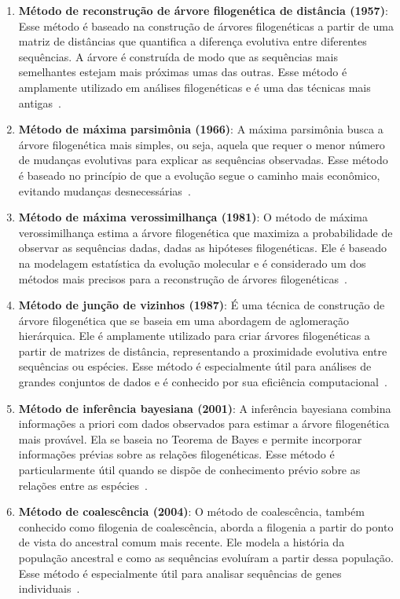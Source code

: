 \begin{enumerate}
  \item \textbf{Método de reconstrução de árvore filogenética de distância (1957)}: Esse método é baseado na construção de árvores filogenéticas a partir de uma matriz de distâncias que quantifica a diferença evolutiva entre diferentes sequências. A árvore é construída de modo que as sequências mais semelhantes estejam mais próximas umas das outras. Esse método é amplamente utilizado em análises filogenéticas e é uma das técnicas mais antigas~\cite{sokal_statistical_method_1958}.
  \item \textbf{Método de máxima parsimônia (1966)}: A máxima parsimônia busca a árvore filogenética mais simples, ou seja, aquela que requer o menor número de mudanças evolutivas para explicar as sequências observadas. Esse método é baseado no princípio de que a evolução segue o caminho mais econômico, evitando mudanças desnecessárias~\cite{fitch_toward_definition_1971}.
  \item \textbf{Método de máxima verossimilhança (1981)}: O método de máxima verossimilhança estima a árvore filogenética que maximiza a probabilidade de observar as sequências dadas, dadas as hipóteses filogenéticas. Ele é baseado na modelagem estatística da evolução molecular e é considerado um dos métodos mais precisos para a reconstrução de árvores filogenéticas~\cite{felsenstein_evolutionary_tree_1981}.
  \item \textbf{Método de junção de vizinhos (1987)}: É uma técnica de construção de árvore filogenética que se baseia em uma abordagem de aglomeração hierárquica. Ele é amplamente utilizado para criar árvores filogenéticas a partir de matrizes de distância, representando a proximidade evolutiva entre sequências ou espécies. Esse método é especialmente útil para análises de grandes conjuntos de dados e é conhecido por sua eficiência computacional~\cite{saitou_neighbor_1987}. %
  \item \textbf{Método de inferência bayesiana (2001)}: A inferência bayesiana combina informações a priori com dados observados para estimar a árvore filogenética mais provável. Ela se baseia no Teorema de Bayes e permite incorporar informações prévias sobre as relações filogenéticas. Esse método é particularmente útil quando se dispõe de conhecimento prévio sobre as relações entre as espécies~\cite{huelsenbeck_bayesian_inference_2001}.
  \item \textbf{Método de coalescência (2004)}: O método de coalescência, também conhecido como filogenia de coalescência, aborda a filogenia a partir do ponto de vista do ancestral comum mais recente. Ele modela a história da população ancestral e como as sequências evoluíram a partir dessa população. Esse método é especialmente útil para analisar sequências de genes individuais~\cite{kingman_coalescent_1982}.

\end{enumerate}
